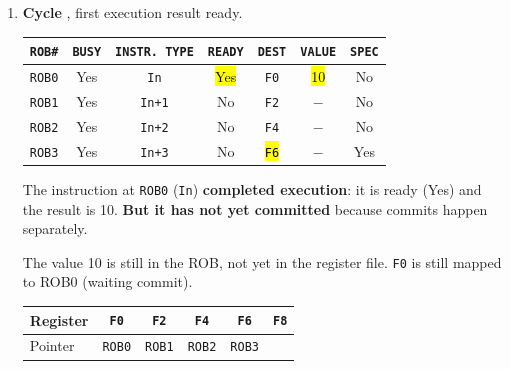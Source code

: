 \begin{examplebox}
\begin{enumerate}
        \item \textbf{Cycle \theenumi}, first execution result ready.
        \begin{center}
            \begin{tabular}{@{} c | c | c | c | c | c | c @{}}
                \toprule
                \texttt{ROB\#} & \texttt{BUSY} & \texttt{INSTR. TYPE} & \texttt{READY} & \texttt{DEST} & \texttt{VALUE} & \texttt{SPEC} \\
                \midrule
                \texttt{ROB0} & Yes         & \texttt{In}           & \hl{Yes}  & \texttt{F0}       & \hl{10}   & No            \\ [.3em]
                \texttt{ROB1} & Yes         & \texttt{In+1}         & No        & \texttt{F2}       & $-$       & No            \\ [.3em]
                \texttt{ROB2} & Yes         & \texttt{In+2}         & No        & \texttt{F4}       & $-$       & No            \\ [.3em]
                \texttt{ROB3} & Yes         & \texttt{In+3}         & No        & \hl{\texttt{F6}}  & $-$       & Yes           \\
                \bottomrule
            \end{tabular}
        \end{center}
        The instruction at \texttt{ROB0} (\texttt{In}) \textbf{completed execution}: it is ready (Yes) and the result is 10. \textbf{But it has not yet committed} because commits happen separately.

        The value 10 is still in the ROB, not yet in the register file. \texttt{F0} is still mapped to ROB0 (waiting commit).
        \begin{center}
            \begin{tabular}{@{} l | c c c c c @{}}
                \toprule
                Register    & \texttt{F0}   & \texttt{F2}   & \texttt{F4}           & \texttt{F6}           & \texttt{F8} \\
                \midrule
                Pointer     & \texttt{ROB0} & \texttt{ROB1} & \texttt{ROB2}         & \texttt{ROB3}         &             \\
                \bottomrule
            \end{tabular}
        \end{center}


        \newpage



\end{enumerate}
\end{examplebox}
